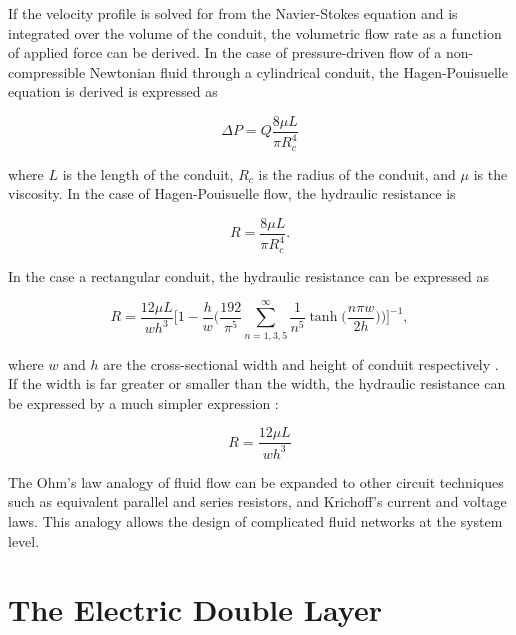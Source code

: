 \par If the velocity profile is solved for from the Navier-Stokes equation and is integrated over the volume of the conduit, the volumetric flow rate as a function of applied force can be derived. In the case of pressure-driven flow of a non-compressible Newtonian fluid through a cylindrical conduit, the Hagen-Pouisuelle equation is derived is expressed as

\begin{equation}
    \Delta P = Q \frac{8\mu L}{\pi R_c^4}
\end{equation}

\noindent where $L$ is the length of the conduit, $R_c$ is the radius of the conduit, and $\mu$ is the viscosity. In the case of Hagen-Pouisuelle flow, the hydraulic resistance is 

\begin{equation}
    R = \frac{8\mu L}{\pi R_c^4}.
\end{equation}

\par In the case a rectangular conduit, the hydraulic resistance can be expressed as

\begin{equation}
    R = \frac{12\mu L}{wh^3}\Bigg[1 - \frac{h}{w}\bigg( \frac{192}{\pi^5} \sum_{n=1,3,5}^\infty \frac{1}{n^5} \tanh\Big(\frac{n\pi w}{2h}\Big) \bigg) \Bigg]^{-1},
\end{equation}

\noindent where $w$ and $h$ are the cross-sectional width and height of conduit respectively \cite{david_j._beebe_physics_2002}. If the width is far greater or smaller than the width, the hydraulic resistance can be expressed by a much simpler expression \cite{david_j._beebe_physics_2002}:

\begin{equation}
    R = \frac{12 \mu L}{wh^3} 
\end{equation}

\par The Ohm's law analogy of fluid flow can be expanded to other circuit techniques such as equivalent parallel and series resistors, and Krichoff's current and voltage laws. This analogy allows the design of complicated fluid networks at the system level.

\section{The Electric Double Layer}


